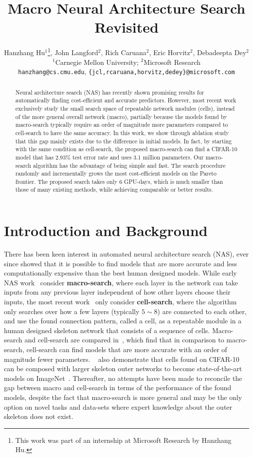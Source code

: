 \documentclass{article}
\title{Macro Neural Architecture Search Revisited}
\author{
Hanzhang Hu$^{1}$\thanks{This work was part of an internship at Microsoft Research by Hanzhang Hu.}, John Langford$^{2}$, Rich Caruana$^{2}$, Eric Horvitz$^{2}$, Debadeepta Dey$^{2}$  \\
$^{1}$Carnegie Mellon University; $^2$Microsoft Research \\
\texttt{hanzhang@cs.cmu.edu},  \texttt{\{jcl,rcaruana,horvitz,dedey\}@microsoft.com} 
}
\begin{document}

\maketitle

\begin{abstract}
Neural architecture search (NAS) has recently shown promising results for automatically finding cost-efficient and accurate predictors. However, most recent work exclusively study the small search space of repeatable network modules (cells), instead of the more general overall network (macro), partially because the models found by macro-search typically require an order of magnitude more parameters compared to cell-search to have the same accuracy. In this work, we show through ablation study that this gap mainly exists due to the difference in initial models. In fact, by starting with the same condition as cell-search, the proposed macro-search can find a CIFAR-10 model that has 2.93\% test error rate and uses 3.1 million parameters. Our macro-search algorithm has the advantage of being simple and fast. The search procedure randomly and incrementally grows the most cost-efficient models on the Pareto frontier. The proposed search takes only 6 GPU-days, which is much smaller than those of many existing methods, while achieving comparable or better results. 
\end{abstract}

\section{Introduction and Background}
\label{sec:introduction}
There has been keen interest in automated neural architecture search (NAS), ever since \citet{NAS} showed that it is possible to find models that are more accurate and less computationally expensive than the best human designed models. While early NAS work~\citep{NAS,Real2017EvoNet} consider \textbf{macro-search}, where each layer in the network can take inputs from any previous layer independent of how other layers choose their inputs, the most recent work~\citep{Liu2018DARTSDA,NAONet,CaiPathLevel} only consider \textbf{cell-search}, where the algorithm only searches over how a few layers (typically $5\sim8$) are connected to each other, and use the found connection pattern, called a cell, as a repeatable module in a human designed skeleton network that consists of a sequence of cells. Macro-search and cell-search are compared in~\citep{NASCell,Liu2017ProgressiveNA,Pham2018EfficientNA,Elsken2018EfficientMN}, which find that in comparison to macro-search, cell-search can find models that are more accurate with an order of magnitude fewer parameters. ~\citet{NASCell} also demonstrate that cells found on CIFAR-10 can be composed with larger skeleton outer networks to become state-of-the-art models on ImageNet~\citep{ILSVRC15}.
Thereafter, no attempts have been made to reconcile the gap between macro and cell-search in terms of the performance of the found models, despite the fact that macro-search is more general and may be the only option on novel tasks and data-sets where expert knowledge about the outer skeleton does not exist. 
\end{document}
